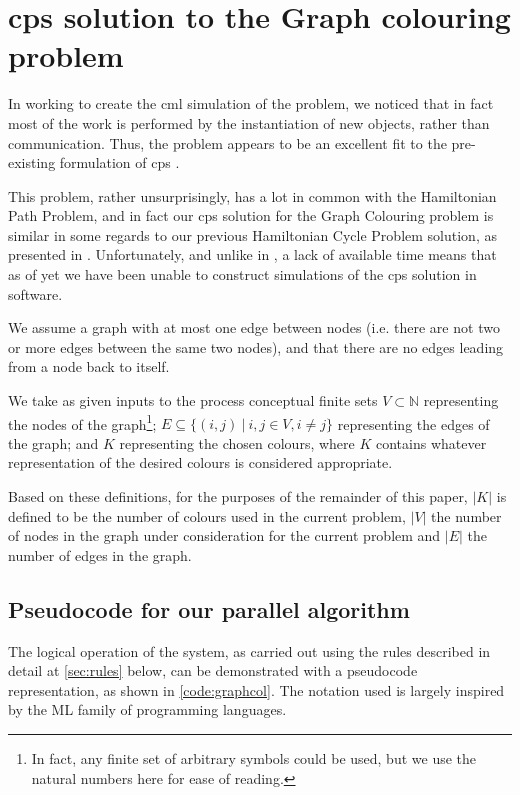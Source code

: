 \section{\label{sec:cpsys}\texorpdfstring{\gls{cps}}{cP systems} solution to the Graph colouring problem}
In working to create the \gls{cml} simulation of the problem, we noticed that in fact most of the work is performed by the instantiation of new objects, rather than communication.  Thus, the problem appears to be an excellent fit to the pre-existing formulation of \gls{cps} \cite{Nicolescu2018}.

This problem, rather unsurprisingly, has a lot in common with the Hamiltonian Path Problem, and in fact our \gls{cps} solution for the Graph Colouring problem is similar in some regards to our previous Hamiltonian Cycle Problem solution, as presented in \cite{Cooper2019}.  Unfortunately, and unlike in \cite{Cooper2019}, a lack of available time means that as of yet we have been unable to construct simulations of the \gls{cps} solution in software.

We assume a graph with at most one edge between nodes (i.e. there are not two or more edges between the same two nodes), and that there are no edges leading from a node back to itself.

We take as given inputs to the process conceptual finite sets \(V \subset \mathbb{N}\) representing the nodes of the graph\footnote{In fact, any finite set of arbitrary symbols could be used, but we use the natural numbers here for ease of reading.}; \(E \subseteq \{(i,j)~|~i, j \in V, i \neq j \}\) representing the edges of the graph; and \(K\) representing the chosen colours, where \(K\) contains whatever representation of the desired colours is considered appropriate.

Based on these definitions, for the purposes of the remainder of this paper, \(|K|\) is defined to be the number of colours used in the current problem, \(|V|\) the number of nodes in the graph under consideration for the current problem and \(|E|\) the number of edges in the graph.

\subsection{Pseudocode for our parallel algorithm}
The logical operation of the system, as carried out using the rules described in detail at \autoref{sec:rules} below, can be demonstrated with a pseudocode representation, as shown in \autoref{code:graphcol}.  The notation used is largely inspired by the ML family of programming languages.

